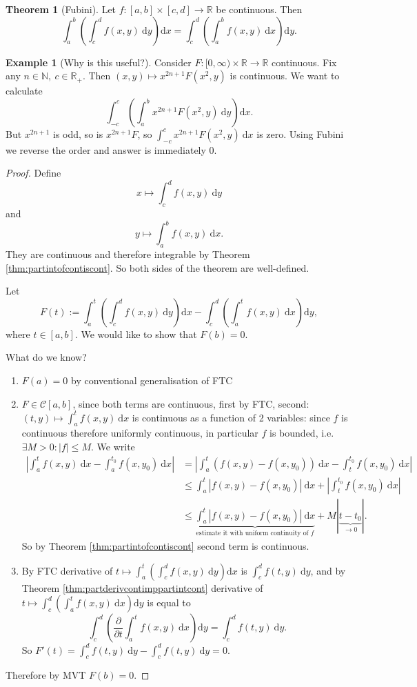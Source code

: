 \documentclass[a4paper]{article}
\theoremstyle{definition}
\newtheorem{thm}[defn]{Theorem}
\newtheorem{example}[defn]{Example}
\begin{document}
\begin{thm}[Fubini]
Let $f:[a,b]\times [c,d] \rightarrow \mathbb R$ be continuous. Then
\[
\int_a^b \left(\int_c^d f(x,y) \ \mathrm d y\right)\mathrm d x=\int_c^d \left(\int_a^b f(x,y) \ \mathrm d x\right)\mathrm d y .
\]
\end{thm}
\begin{example}[Why is this useful?]
Consider $F:[0,\infty ) \times \mathbb R \rightarrow \mathbb R$ continuous. Fix any $n\in \mathbb N, \ c\in \mathbb R_+$. Then $(x,y)\mapsto x^{2n+1}F(x^2,y)$ is continuous. We want to calculate
\[
\int_{-c}^c \left(\int_a^b x^{2n+1}F(x^2,y) \ \mathrm d y\right) \mathrm d x .
\]
But $x^{2n+1}$ is odd, so is $x^{2n+1}F$, so $\int_{-c}^c x^{2n+1}F(x^2,y) \ \mathrm d x$ is zero. Using Fubini we reverse the order and answer is immediately 0.
\end{example}
\begin{proof}
Define
\[
x\mapsto \int_c^d f(x,y) \ \mathrm d y
\]
and
\[
y\mapsto \int_a^b f(x,y) \ \mathrm d x .
\]
They are continuous and therefore integrable by Theorem \ref{thm:partintofcontiscont}. So both sides of the theorem are well-defined.

Let
\[
F(t):=\int_a^t \left( \int_c^d f(x,y) \ \mathrm d y\right) \mathrm d x-\int_c^d \left(\int_a^t f(x,y) \ \mathrm d x\right) \mathrm d y,
\]
where $t\in [a,b]$. We would like to show that $F(b)=0$.

What do we know?
\begin{enumerate}
    \item $F(a)=0$ by conventional generalisation of FTC
    \item $F\in \mathcal C[a,b]$, since both terms are continuous, first by FTC, second: $(t,y)\mapsto \int_a^t f(x,y) \ \mathrm d x$ is continuous as a function of 2 variables: since $f$ is continuous therefore uniformly continuous, in particular $f$ is bounded, i.e. $\exists M>0: |f|\leq M$. We write
\[
\begin{aligned}\left|\int_a^t f(x,y) \ \mathrm d x - \int_a^{t_0} f(x,y_0) \ \mathrm d x \right|&=\left|\int_a^t (f(x,y)-f(x,y_0)) \ \mathrm d x -\int_t^{t_0} f(x,y_0) \ \mathrm d x\right|\\&\leq \int_a^t |f(x,y)-f(x,y_0)| \ \mathrm d x + \left|\int_t^{t_0}f(x,y_0) \ \mathrm d x \right| \\ &\leq \underbrace{\int_a^t |f(x,y) -f(x,y_0)| \ \mathrm d x}_{\text{estimate it with uniform continuity of }f} + M|\underbrace{t-t_0}_{\rightarrow 0}| . \end{aligned}
\]
So by Theorem \ref{thm:partintofcontiscont} second term is continuous.
    \item By FTC derivative of $t\mapsto \int_a^t \left( \int_c^d f(x,y) \ \mathrm d y\right) \mathrm d x$ is $\int_c^d f(t,y) \ \mathrm d y$, and by Theorem \ref{thm:partderivcontimppartintcont} derivative of $t\mapsto \int_c^d \left(\int_a^t f(x,y) \ \mathrm d x \right) \mathrm d y$ is equal to
\[
\int_c^d \left(\frac{\partial}{\partial t} \int_a^t f(x,y) \ \mathrm d x \right) \mathrm d y =\int_c^d f(t,y) \ \mathrm d y.
\]
So $F'(t) = \int_c^d f(t,y) \ \mathrm d y-\int_c^d f(t,y) \ \mathrm d y=0.$
\end{enumerate}
Therefore by MVT $F(b)=0$.
\end{proof}
\end{document}
